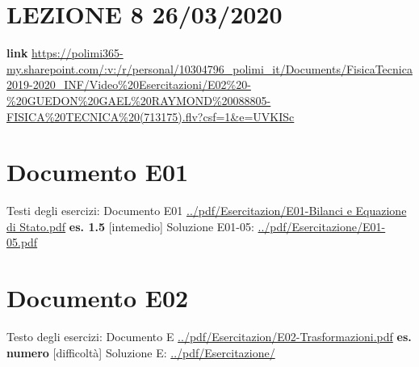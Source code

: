 \section*{LEZIONE 8 26/03/2020}
\textbf{link} \url{https://polimi365-my.sharepoint.com/:v:/r/personal/10304796_polimi_it/Documents/FisicaTecnica2019-2020_INF/Video%20Esercitazioni/E02%20-%20GUEDON%20GAEL%20RAYMOND%20088805-FISICA%20TECNICA%20(713175).flv?csf=1&e=UVKISc}
\section*{Documento E01}
Testi degli esercizi:\newline
Documento E01 \url{../pdf/Esercitazion/E01-Bilanci e Equazione di Stato.pdf}\newline
\newline
\textbf{es. 1.5} [intemedio]\newline
Soluzione E01-05: \url{../pdf/Esercitazione/E01-05.pdf}
\section*{Documento E02}
Testo degli esercizi:\newline
Documento E \url{../pdf/Esercitazion/E02-Trasformazioni.pdf}\newline
\newline
\textbf{es. numero} [difficoltà]\newline
Soluzione E: \url{../pdf/Esercitazione/}